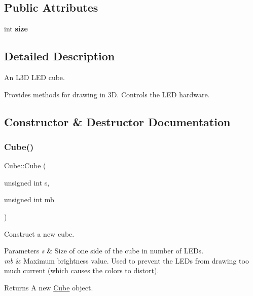 \subsection*{Public Attributes}
\begin{DoxyCompactItemize}
\item 
\mbox{\label{classCube_a0b22d70154fa77b63777659a8751b799}} 
int {\bfseries size}
\end{DoxyCompactItemize}


\subsection{Detailed Description}
An L3D L\+ED cube. 

Provides methods for drawing in 3D. Controls the L\+ED hardware. 

\subsection{Constructor \& Destructor Documentation}
\mbox{\label{classCube_a3ac832a5fc2640677703e9e47d5f4e3a}} 
\subsubsection{\texorpdfstring{Cube()}{Cube()}\hspace{0.1cm}{\footnotesize\ttfamily [1/2]}}
{\footnotesize\ttfamily Cube\+::\+Cube (\begin{DoxyParamCaption}\item[{unsigned int}]{s,  }\item[{unsigned int}]{mb }\end{DoxyParamCaption})}



Construct a new cube. 


\begin{DoxyParams}{Parameters}
{\em s} & Size of one side of the cube in number of L\+E\+Ds. \\
\hline
{\em mb} & Maximum brightness value. Used to prevent the L\+E\+Ds from drawing too much current (which causes the colors to distort).\\
\hline
\end{DoxyParams}
\begin{DoxyReturn}{Returns}
A new \mbox{\hyperlink{classCube}{Cube}} object. 
\end{DoxyReturn}
\mbox{\label{classCube_ac51192b04110f845ae10597bc0721716}} 
